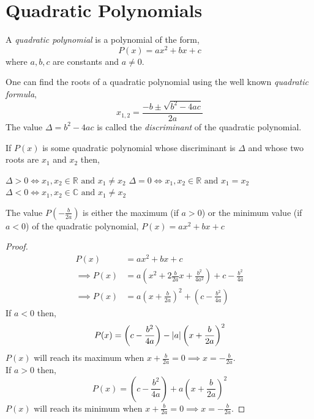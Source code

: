 \section{Quadratic Polynomials}
\begin{definition}
    A \textit{quadratic polynomial} is a polynomial of the form,
    \[
        P(x) = ax^{2} + bx + c
    \]
    where $a,b,c$ are constants and $a\neq 0$.
\end{definition}
One can find the roots of a quadratic polynomial using the well known \textit{quadratic formula},
\[
    x_{1,2} = \frac{-b \pm \sqrt{b^{2} - 4ac}}{2a}
\]
The value $\Delta = b^{2} - 4ac$ is called the \textit{discriminant} of the quadratic polynomial. 
\begin{theorem}
    If $P(x)$ is some quadratic polynomial whose discriminant is $\Delta$ and 
    whose two roots are $x_{1}$ and $x_{2}$ then,
    \begin{itemize}
            \ii $\Delta>0 \iff x_{1}, x_{2} \in \mathbb{R} \text{ and } x_{1}\neq x_{2}$
            \ii $\Delta=0 \iff x_{1}, x_{2} \in \mathbb{R} \text{ and } x_{1}=x_{2}$
            \ii $\Delta<0 \iff x_{1}, x_{2} \in \mathbb{C} \text{ and } x_{1}\neq x_{2}$
    \end{itemize}
\end{theorem}

\begin{theorem}
    The value $P\left(-\frac{b}{2a}\right)$ is either the maximum (if $a>0$) or the minimum value (if $a<0$) of 
    the quadratic polynomial, $P(x)=ax^{2} + bx + c$
\end{theorem}
\begin{proof}
    \begin{align*}
                 P(x) &= ax^{2} + bx + c\\
        \implies P(x) &= a\left( x^{2} + 2\frac{b}{2a} x + \frac{b^{2}}{4a^{2}}\right) + c - \frac{b^{2}}{4a} \\
        \implies P(x) &= a\left(x + \frac{b}{2a}\right)^{2} + \left( c - \frac{b^{2}}{4a} \right)
    \end{align*}
    If $a<0$ then, 
    \[
        P(x) = \left( c - \frac{b^{2}}{4a}\right) - \left\lvert a \right\rvert\left(x + \frac{b}{2a}\right)^{2}
    \]
    $P(x)$ will reach its maximum when $x + \frac{b}{2a} =0 \implies x = -\frac{b}{2a}$.\\
    If $a>0$ then,
    \[
        P(x) = \left( c - \frac{b^{2}}{4a}\right) + a\left(x + \frac{b}{2a}\right)^{2}
    \]
    $P(x)$ will reach its minimum when $x + \frac{b}{2a} =0 \implies x = -\frac{b}{2a}$.
\end{proof}


